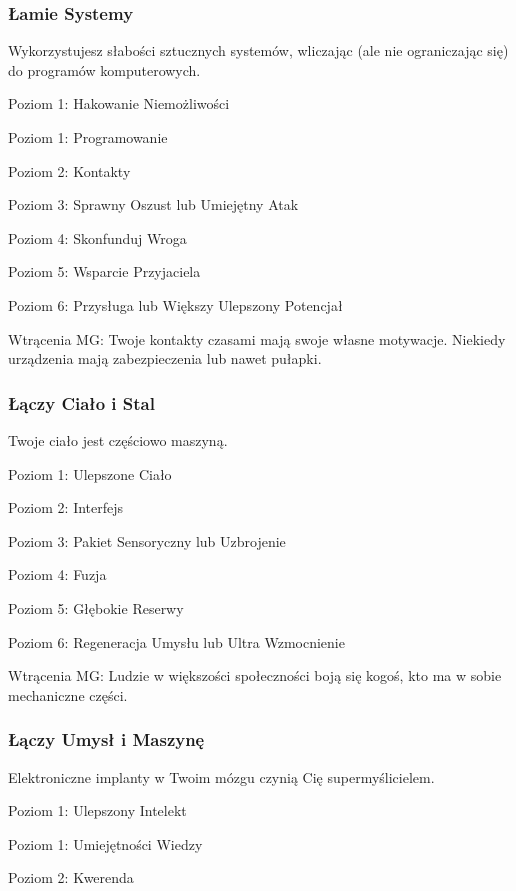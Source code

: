 \subsubsection{Łamie Systemy}

Wykorzystujesz słabości sztucznych systemów, wliczając (ale nie ograniczając się) do programów komputerowych.

Poziom 1: Hakowanie Niemożliwości

Poziom 1: Programowanie

Poziom 2: Kontakty

Poziom 3: Sprawny Oszust lub Umiejętny Atak

Poziom 4: Skonfunduj Wroga

Poziom 5: Wsparcie Przyjaciela

Poziom 6: Przysługa lub Większy Ulepszony Potencjał

Wtrącenia MG: Twoje kontakty czasami mają swoje własne motywacje. Niekiedy urządzenia mają zabezpieczenia lub nawet pułapki.

\subsubsection{Łączy Ciało i Stal}

Twoje ciało jest częściowo maszyną.

Poziom 1: Ulepszone Ciało

Poziom 2: Interfejs

Poziom 3: Pakiet Sensoryczny lub Uzbrojenie

Poziom 4: Fuzja

Poziom 5: Głębokie Reserwy

Poziom 6: Regeneracja Umysłu lub Ultra Wzmocnienie

Wtrącenia MG: Ludzie w większości społeczności boją się kogoś, kto ma w sobie mechaniczne części.

\subsubsection{Łączy Umysł i Maszynę}

Elektroniczne implanty w Twoim mózgu czynią Cię supermyślicielem.

Poziom 1: Ulepszony Intelekt

Poziom 1: Umiejętności Wiedzy

Poziom 2: Kwerenda

